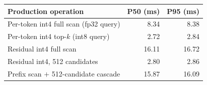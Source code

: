 \begin{tabular}{lrr}
\toprule
Production operation & P50 (ms) & P95 (ms) \\
\midrule
Per-token int4 full scan (fp32 query) & 8.34 & 8.38 \\
Per-token int4 top-$k$ (int8 query) & 2.72 & 2.84 \\
Residual int4 full scan & 16.11 & 16.72 \\
Residual int4, 512 candidates & 2.80 & 2.86 \\
Prefix scan $+$ 512-candidate cascade & 15.87 & 16.09 \\
\bottomrule
\end{tabular}
